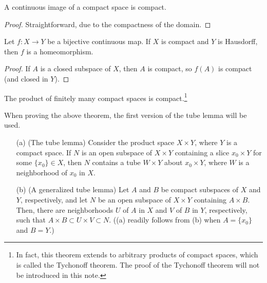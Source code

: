 \begin{prop}
    A continuous image of a compact space is compact.
\end{prop}
\begin{proof}
    Straightforward, due to the compactness of the domain.
\end{proof}

\begin{prop}
    Let $f: X\rightarrow Y$ be a bijective continuous map.
    If $X$ is compact and $Y$ is Hausdorff, then $f$ is a homeomorphism.
\end{prop}
\begin{proof}
    If $A$ is a closed subspace of $X$, then $A$ is compact, so $f(A)$ is compact (and closed in $Y$).
\end{proof}

\begin{thm}\label{products of compact spaces}
    The product of finitely many compact spaces is compact.\footnote{In fact, this theorem extends to arbitrary products of compact spaces, which is called the Tychonoff theorem.
    The proof of the Tychonoff theorem will not be introduced in this note.}
\end{thm}
When proving the above theorem, the first version of the tube lemma will be used.
\begin{lem}\label{tube lemmas}
    \begin{enumerate}
        \item[(a)]
        {
            (The tube lemma)
            Consider the product space $X\times Y$, where $Y$ is a compact space.
            If $N$ is an open subspace of $X\times Y$ containing a slice $x_0\times Y$ for some $\{x_0\}\in X$, then $N$ contains a tube $W\times Y$ about $x_0\times Y$, where $W$ is a neighborhood of $x_0$ in $X$.
        }
        \item[(b)]
        {
            (A generalized tube lemma)
            Let $A$ and $B$ be compact subspaces of $X$ and $Y$, respectively, and let $N$ be an open subspace of $X\times Y$ containing $A\times B$.
            Then, there are neighborhoods $U$ of $A$ in $X$ and $V$ of $B$ in $Y$, respectively, such that $A\times B\subset U\times V\subset N$.
            ((a) readily follows from (b) when $A=\{x_0\}$ and $B=Y$.)
        }
    \end{enumerate}
\end{lem}
